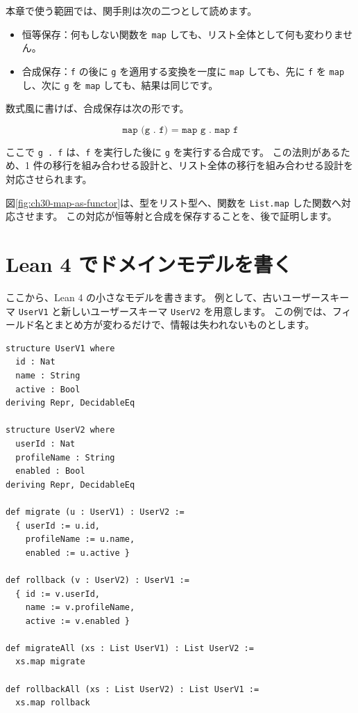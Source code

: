 本章で使う範囲では、関手則は次の二つとして読めます。
\begin{itemize}
\item 恒等保存：何もしない関数を \texttt{map} しても、リスト全体として何も変わりません。
\item 合成保存：\texttt{f} の後に \texttt{g} を適用する変換を一度に \texttt{map} しても、先に \texttt{f} を \texttt{map} し、次に \texttt{g} を \texttt{map} しても、結果は同じです。
\end{itemize}

数式風に書けば、合成保存は次の形です。

\[
  \texttt{map (g . f) = map g . map f}
\]

ここで \texttt{g . f} は、\texttt{f} を実行した後に \texttt{g} を実行する合成です。
この法則があるため、1 件の移行を組み合わせる設計と、リスト全体の移行を組み合わせる設計を対応させられます。

図\ref{fig:ch30-map-as-functor}は、型をリスト型へ、関数を \texttt{List.map} した関数へ対応させます。
この対応が恒等射と合成を保存することを、後で証明します。


\section{Lean 4 でドメインモデルを書く}

ここから、Lean 4 の小さなモデルを書きます。
例として、古いユーザースキーマ \texttt{UserV1} と新しいユーザースキーマ \texttt{UserV2} を用意します。
この例では、フィールド名とまとめ方が変わるだけで、情報は失われないものとします。

\begin{listing}[htbp]
\begin{verbatim}
structure UserV1 where
  id : Nat
  name : String
  active : Bool
deriving Repr, DecidableEq

structure UserV2 where
  userId : Nat
  profileName : String
  enabled : Bool
deriving Repr, DecidableEq

def migrate (u : UserV1) : UserV2 :=
  { userId := u.id,
    profileName := u.name,
    enabled := u.active }

def rollback (v : UserV2) : UserV1 :=
  { id := v.userId,
    name := v.profileName,
    active := v.enabled }

def migrateAll (xs : List UserV1) : List UserV2 :=
  xs.map migrate

def rollbackAll (xs : List UserV2) : List UserV1 :=
  xs.map rollback
\end{verbatim}
\caption{\texttt{migrateAll} と \texttt{rollbackAll}}
\label{lst:ch30-domain-model}
\end{listing}

